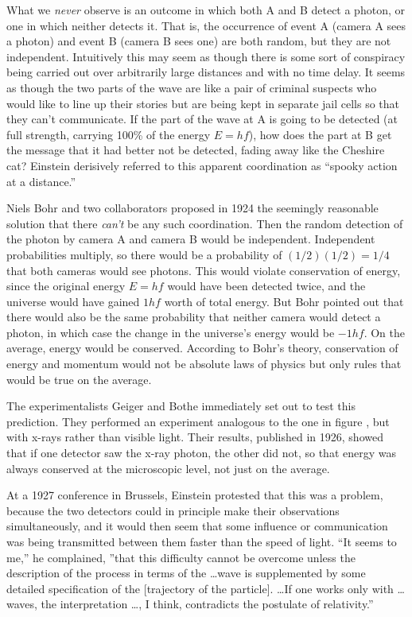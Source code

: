 What we \emph{never} observe is an outcome in which both A and B
detect a photon, or one in which neither detects it. That is, the
occurrence of event A (camera A sees a photon) and event B (camera B
sees one) are both random, but they are not independent. Intuitively
this may seem as though there is some sort of conspiracy being carried
out over arbitrarily large distances and with no time delay. It seems
as though the two parts of the wave are like a pair of criminal
suspects who would like to line up their stories but are being kept in
separate jail cells so that they can't communicate.  If the part of
the wave at A is going to be detected (at full strength, carrying
100\% of the energy $E=hf$), how does the part at B get the message
that it had better not be detected, fading away like the Cheshire cat?
Einstein derisively referred to this apparent coordination as ``spooky
action at a distance.''

Niels Bohr and two collaborators proposed in 1924 the
seemingly reasonable solution that there \emph{can't} be any such
coordination. Then the random detection of the photon by camera A
and camera B would be independent. Independent probabilities multiply,
so there would be a probability of $(1/2)(1/2)=1/4$ that both cameras
would see photons. This would violate conservation of energy, since
the original energy $E=hf$ would have been detected twice, and the universe
would have gained $1hf$ worth of total energy. But Bohr
pointed out that there would also be the same probability that neither
camera would detect a photon, in which case the change in the universe's
energy would be $-1hf$. On the average, energy would be conserved. According
to Bohr's theory, conservation of energy and momentum would not be absolute
laws of physics but only rules that would be true on the average.

The experimentalists Geiger and Bothe immediately set out to test this
prediction. They performed an experiment analogous to the one in
figure , but with x-rays rather than visible
light.  Their results, published in 1926, showed that if one detector
saw the x-ray photon, the other did not, so that energy was always
conserved at the microscopic level, not just on the average.

At a 1927 conference in Brussels, Einstein protested that this was a
problem, because the two detectors could in principle make their
observations simultaneously, and it would then seem that some
influence or communication was being transmitted between them faster
than the speed of light.  ``It seems to me,'' he complained, ''that
this difficulty cannot be overcome unless the description of the
process in terms of the \ldots wave is supplemented by some detailed
specification of the [trajectory of the particle]. \ldots If one works
only with \ldots waves, the interpretation \ldots, I think,
contradicts the postulate of relativity.''

